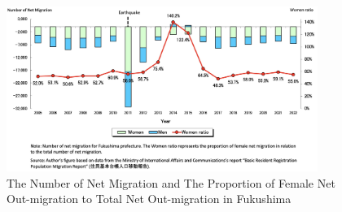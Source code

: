\documentclass[a4paper,12pt]{article}
\begin{document}
\begin{figure}[h!]
    \centering
    \includegraphics[width=0.9\textwidth]{Number of net migration}  %
    \caption{The Number of Net Migration and The Proportion of Female Net Out-migration to Total Net Out-migration in Fukushima}
    \label{fig:number_of_net_migration}
\end{figure}




\end{document}
